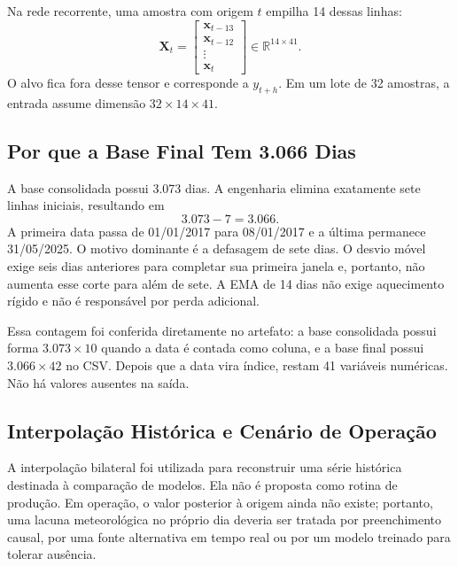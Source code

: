 Na rede recorrente, uma amostra com origem $t$ empilha 14 dessas linhas:
\begin{equation}
    \mathbf{X}_t=
    \begin{bmatrix}
    \mathbf{x}_{t-13}\\
    \mathbf{x}_{t-12}\\
    \vdots\\
    \mathbf{x}_{t}
    \end{bmatrix}\in\mathbb{R}^{14\times41}.
\end{equation}
O alvo fica fora desse tensor e corresponde a $y_{t+h}$. Em um lote de 32 amostras, a entrada assume dimensão $32\times14\times41$.

\subsection{Por que a Base Final Tem 3.066 Dias}

A base consolidada possui 3.073 dias. A engenharia elimina exatamente sete linhas iniciais, resultando em
\begin{equation}
    3.073-7=3.066.
\end{equation}
A primeira data passa de 01/01/2017 para 08/01/2017 e a última permanece 31/05/2025. O motivo dominante é a defasagem de sete dias. O desvio móvel exige seis dias anteriores para completar sua primeira janela e, portanto, não aumenta esse corte para além de sete. A EMA de 14 dias não exige aquecimento rígido e não é responsável por perda adicional.

Essa contagem foi conferida diretamente no artefato: a base consolidada possui forma $3.073\times10$ quando a data é contada como coluna, e a base final possui $3.066\times42$ no CSV. Depois que a data vira índice, restam 41 variáveis numéricas. Não há valores ausentes na saída.

\subsection{Interpolação Histórica e Cenário de Operação}

A interpolação bilateral foi utilizada para reconstruir uma série histórica destinada à comparação de modelos. Ela não é proposta como rotina de produção. Em operação, o valor posterior à origem ainda não existe; portanto, uma lacuna meteorológica no próprio dia deveria ser tratada por preenchimento causal, por uma fonte alternativa em tempo real ou por um modelo treinado para tolerar ausência.

